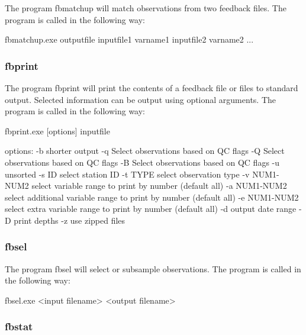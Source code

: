 \documentclass[../tex_main/NEMO_manual]{subfiles}
\begin{document}
The program fbmatchup will match observations from two feedback files.
The program is called in the following way:

\footnotesize
\begin{cmds}
fbmatchup.exe outputfile inputfile1 varname1 inputfile2 varname2 ...
\end{cmds}

\subsubsection{fbprint}

The program fbprint will print the contents of a feedback file or files to standard output.
Selected information can be output using optional arguments.
The program is called in the following way:

\footnotesize
\begin{cmds}
fbprint.exe [options] inputfile

options:
     -b            shorter output
     -q            Select observations based on QC flags
     -Q            Select observations based on QC flags
     -B            Select observations based on QC flags
     -u            unsorted
     -s ID         select station ID  
     -t TYPE       select observation type
     -v NUM1-NUM2  select variable range to print by number 
                      (default all)
     -a NUM1-NUM2  select additional variable range to print by number 
                      (default all)
     -e NUM1-NUM2  select extra variable range to print by number 
                      (default all)
     -d            output date range
     -D            print depths
     -z            use zipped files
\end{cmds}

\subsubsection{fbsel}

The program fbsel will select or subsample observations.
The program is called in the following way:

\footnotesize
\begin{cmds}
fbsel.exe <input filename> <output filename>
\end{cmds}

\subsubsection{fbstat}
\end{document}
